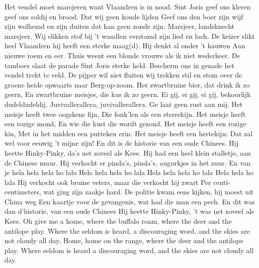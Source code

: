 \documentclass{article}
\begin{document}
\begin{songs}{}
\begin{intersong}
\end{intersong}
\beginverse*
Het vendel moet marsjeren
want Vlaandren is in nood. 
Sint Joris geef ons kleren
geef ons soldij en brood. 
Dat wij geen koude lijden
Geef ons den boer zijn wijf
zijn wolhemd en zijn duiten
dat kan geen zonde zijn. 
\endverse
\beginchorus
Marsjeer, landsknecht marsjeer. 
\endchorus
\beginverse*
Wij slikken stof bij 't wandlen
verstomd zijn lied en lach. 
De keizer slikt heel Vlaandren
hij heeft een sterke maag(d).
Hij denkt al onder 't kauwen
Aan nieuwe roem en eer. 
Thuis weent een blonde vrouwe
als ik niet wederkeer. 
\endverse
\beginverse*
De tamboer slaat de parade
Sint Joris sterke held. 
Bescherm ons in genade
het vendel trekt te veld. 
De pijper wil niet fluiten
wij trekken stil en stom
over de groene heide
opwaarts naar Berg-op-zoom. 
\endverse
\endsong
{}
\beginverse
Het zwartbruine bier, dat drink ik zo geern,
En zwartbruine meisjes, die kus ik zo geern.
Ei gij, ei gij, ei gij, bekoorlijk dudeldudeldij.
Juvivallerallera, juvivallerallera.
Ge laat geen rust aan mij.
\endverse
\beginverse
Het meisje heeft twee oogskens fijn,
Die fonk’len als een sterrekijn.
\endverse
\beginverse
Het meisje heeft een rozige mond,
En wie die kust die wordt gezond.
\endverse
\beginverse
Het meisje heeft een rozige kin,
Met in het midden een putteken erin.
\endverse
\beginverse
Het meisje heeft een hertekijn:
Dat zal wel voor eeuwig 't mijne zijn!
\endverse
\endsong
{}
\beginverse
En dit is de historie van een oude Chinees.
Hij heette Hinky-Pinky, da’s net zoveel als Kees.
Hij had een heel klein stalletje, aan de Chinese muur.
Hij verkocht er pinda’s, pinda’s, augurkjes in het zuur.
\endverse
\beginchorus
En van je hela hela hela ho lala
Hela hela hela ho lala
Hela hela hela ho lala
Hela hela ho lala
\endchorus
\beginverse
Hij verkocht ook bruine veters, maar die verkocht hij zwart
Per centi-centimeters, wat ging zijn zaakje hard.
De politie kwam eens kijken, hij moest uit China weg
Een kaartje voor de gevangenis, wat had die man een pech.
\endverse
\beginverse
En dit was dan d’historie, van een oude Chinees
Hij heette Hinky-Pinky, 't was net zoveel als Kees. 
\endverse
\endsong
{}
\beginverse
Oh give me a home,
where the buffalo roam,
where the deer and the antilope play.
Where the seldom is heard,
a discouraging word,
and the skies are not cloudy all day.
\endverse
\beginchorus
Home, home on the range,
where the deer and the antilope play.
Where seldom is heard
a discouraging word,
and the skies are not cloudy all day.

\end{songs}
\end{document}
